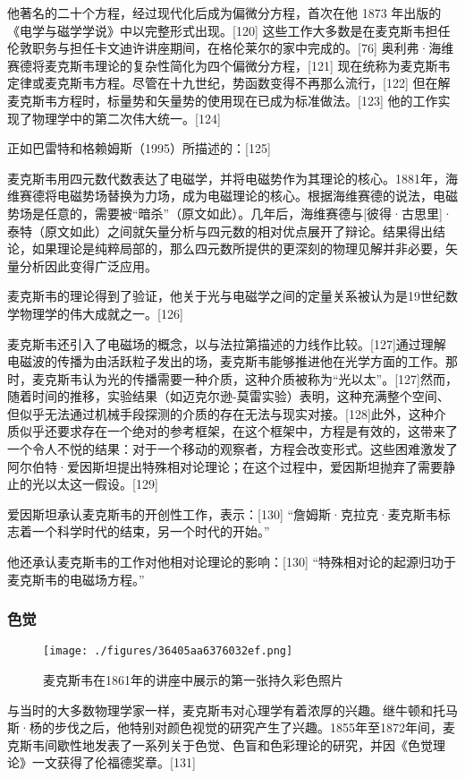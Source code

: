 他著名的二十个方程，经过现代化后成为偏微分方程，首次在他 1873 年出版的《电学与磁学学说》中以完整形式出现。[120] 这些工作大多数是在麦克斯韦担任伦敦职务与担任卡文迪许讲座期间，在格伦莱尔的家中完成的。[76] 奥利弗·海维赛德将麦克斯韦理论的复杂性简化为四个偏微分方程，[121] 现在统称为麦克斯韦定律或麦克斯韦方程。尽管在十九世纪，势函数变得不再那么流行，[122] 但在解麦克斯韦方程时，标量势和矢量势的使用现在已成为标准做法。[123] 他的工作实现了物理学中的第二次伟大统一。[124]

正如巴雷特和格赖姆斯（1995）所描述的：[125]

麦克斯韦用四元数代数表达了电磁学，并将电磁势作为其理论的核心。1881年，海维赛德将电磁势场替换为力场，成为电磁理论的核心。根据海维赛德的说法，电磁势场是任意的，需要被“暗杀”（原文如此）。几年后，海维赛德与[彼得·古思里]·泰特（原文如此）之间就矢量分析与四元数的相对优点展开了辩论。结果得出结论，如果理论是纯粹局部的，那么四元数所提供的更深刻的物理见解并非必要，矢量分析因此变得广泛应用。

麦克斯韦的理论得到了验证，他关于光与电磁学之间的定量关系被认为是19世纪数学物理学的伟大成就之一。[126]

麦克斯韦还引入了电磁场的概念，以与法拉第描述的力线作比较。[127]通过理解电磁波的传播为由活跃粒子发出的场，麦克斯韦能够推进他在光学方面的工作。那时，麦克斯韦认为光的传播需要一种介质，这种介质被称为“光以太”。[127]然而，随着时间的推移，实验结果（如迈克尔逊-莫雷实验）表明，这种充满整个空间、但似乎无法通过机械手段探测的介质的存在无法与现实对接。[128]此外，这种介质似乎还要求存在一个绝对的参考框架，在这个框架中，方程是有效的，这带来了一个令人不悦的结果：对于一个移动的观察者，方程会改变形式。这些困难激发了阿尔伯特·爱因斯坦提出特殊相对论理论；在这个过程中，爱因斯坦抛弃了需要静止的光以太这一假设。[129]

爱因斯坦承认麦克斯韦的开创性工作，表示：[130]  
“詹姆斯·克拉克·麦克斯韦标志着一个科学时代的结束，另一个时代的开始。”

他还承认麦克斯韦的工作对他相对论理论的影响：[130]  
“特殊相对论的起源归功于麦克斯韦的电磁场方程。”
\subsubsection{色觉}
\begin{figure}[ht]
\centering
\texttt{[image: ./figures/36405aa6376032ef.png]}
\caption{麦克斯韦在1861年的讲座中展示的第一张持久彩色照片} \label{fig_Clerk_11}
\end{figure}
与当时的大多数物理学家一样，麦克斯韦对心理学有着浓厚的兴趣。继牛顿和托马斯·杨的步伐之后，他特别对颜色视觉的研究产生了兴趣。1855年至1872年间，麦克斯韦间歇性地发表了一系列关于色觉、色盲和色彩理论的研究，并因《色觉理论》一文获得了伦福德奖章。[131]

